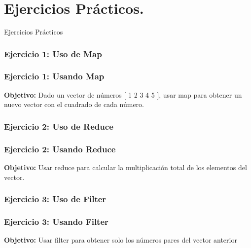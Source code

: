 \documentclass{beamer}
\begin{document}
\section{Ejercicios Prácticos.}
\begin{emptyframe}
    Ejercicios Prácticos
\end{emptyframe}


\subsubsection{Ejercicio 1: Uso de Map}
\begin{frame}[fragile]
\frametitle{Ejercicio 1: Usando Map}
\textbf{Objetivo: } Dado un vector de números [ 1 2 3 4 5 ], usar map para obtener un nuevo vector con el cuadrado de cada número.
\end{frame}


\subsubsection{Ejercicio 2: Uso de Reduce}
\begin{frame}[fragile]
\frametitle{Ejercicio 2: Usando Reduce}
\textbf{Objetivo: } Usar reduce para calcular la multiplicación total de los elementos del vector.
\end{frame}


\subsubsection{Ejercicio 3: Uso de Filter}
\begin{frame}[fragile]
\frametitle{Ejercicio 3: Usando Filter}
\textbf{Objetivo: } Usar filter para obtener solo los números pares del vector anterior
\end{frame}
\end{document}
